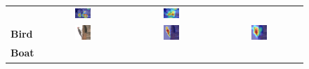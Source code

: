 \begin{figure}[ht]
\begin{tcolorbox}[colframe=black!60, colback=white, boxrule=0.8pt, arc=2pt, left=2pt, right=2pt, top=2pt, bottom=2pt]
\begin{tabular}{m{3cm} c c c}
       & \includegraphics[width=0.20\textwidth,height=0.20\textwidth]
      {figures/val_cams/weclip/2011_000453_1}
       & \includegraphics[width=0.20\textwidth,height=0.20\textwidth]
      {figures/val_cams/ours/2011_000453_1}
      \\
      \textbf{Bird}
       & \includegraphics[width=0.20\textwidth,height=0.20\textwidth]
      {figures/originals/2011_001902}
       & \includegraphics[width=0.20\textwidth,height=0.20\textwidth]
      {figures/val_cams/weclip/2011_001902_2}
       & \includegraphics[width=0.20\textwidth,height=0.20\textwidth]
      {figures/val_cams/ours/2011_001902_2}
      \\
      \textbf{Boat}
       & \includegraphics[width=0.20\textwidth,height=0.20\textwidth]

\end{tabular}
\end{tcolorbox}
\end{figure}
